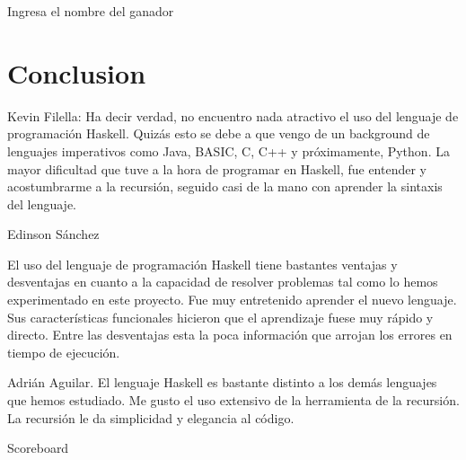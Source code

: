 \documentclass[11pt]{article} %
\begin{document}
\begin{center}
Ingresa el nombre del ganador


\section{Conclusion}

Kevin Filella: Ha decir verdad, no encuentro nada atractivo el uso del lenguaje de programación Haskell. Quizás esto se debe a que vengo de un background de lenguajes imperativos como Java, BASIC, C, C++ y próximamente, Python. La mayor dificultad que tuve a la hora de programar en Haskell, fue entender y acostumbrarme a la recursión, seguido casi de la mano con aprender la sintaxis del lenguaje.


Edinson Sánchez

El uso del lenguaje de programación Haskell tiene bastantes ventajas y desventajas en cuanto a la capacidad de resolver problemas tal como lo hemos experimentado en este proyecto.  Fue muy entretenido aprender el nuevo lenguaje. Sus características funcionales hicieron que el aprendizaje fuese muy rápido y directo. Entre las desventajas esta la poca información que arrojan los errores en tiempo de ejecución. 


Adrián Aguilar. 
El lenguaje Haskell es bastante distinto a los demás lenguajes que hemos estudiado. Me gusto  el uso extensivo de la herramienta de la recursión.  La recursión le da simplicidad y elegancia al código.



\end{center}


\begin{center}
Scoreboard


\end{center}













  
\end{document}
